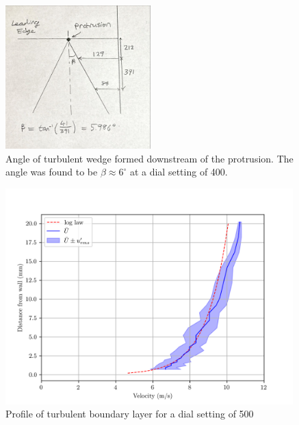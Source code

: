 \documentclass{article}
\begin{document}

\begin{figure}[H]
    \centering
    \includegraphics[width=0.5\textwidth]{turbulent_wedge.jpg}
    \caption{Angle of turbulent wedge formed downstream of the protrusion. The angle was found to be $\beta \approx 6^\circ$ at a dial setting of 400.}
    \label{fig:turbulent_wedge}
\end{figure}


\begin{figure}[H]
    \centering
    \includegraphics[width=0.99\textwidth]{turbulent_profile.png}
    \caption{Profile of turbulent boundary layer for a dial setting of 500}
    \label{fig:turbulent_profile}
\end{figure}
\end{document}
